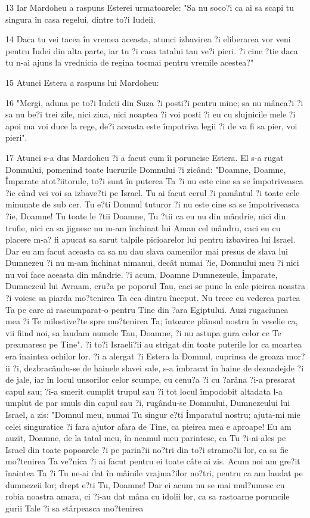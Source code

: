 \par 13 Iar Mardoheu a raspuns Esterei urmatoarele: "Sa nu soco?i ca ai sa scapi tu singura în casa regelui, dintre to?i Iudeii.
\par 14 Daca tu vei tacea în vremea aceasta, atunci izbavirea ?i eliberarea vor veni pentru Iudei din alta parte, iar tu ?i casa tatalui tau ve?i pieri. ?i cine ?tie daca tu n-ai ajuns la vrednicia de regina tocmai pentru vremile acestea?"
\par 15 Atunci Estera a raspuns lui Mardoheu:
\par 16 "Mergi, aduna pe to?i Iudeii din Suza ?i posti?i pentru mine; sa nu mânca?i ?i sa nu be?i trei zile, nici ziua, nici noaptea ?i voi posti ?i eu cu slujnicile mele ?i apoi ma voi duce la rege, de?i aceasta este împotriva legii ?i de va fi sa pier, voi pieri".
\par 17 Atunci s-a dus Mardoheu ?i a facut cum îi poruncise Estera. El s-a rugat Domnului, pomenind toate lucrurile Domnului ?i zicând: "Doamne, Doamne, Împarate atot?iitorule, to?i sunt în puterea Ta ?i nu este cine sa se împotriveasca ?ie când vei voi sa izbave?ti pe Israel. Tu ai facut cerul ?i pamântul ?i toate cele minunate de sub cer. Tu e?ti Domnul tuturor ?i nu este cine sa se împotriveasca ?ie, Doamne! Tu toate le ?tii Doamne, Tu ?tii ca eu nu din mândrie, nici din trufie, nici ca sa jignesc nu m-am închinat lui Aman cel mândru, caci eu cu placere m-a? fi apucat sa sarut talpile picioarelor lui pentru izbavirea lui Israel. Dar eu am facut aceasta ca sa nu dau slava oamenilor mai presus de slava lui Dumnezeu ?i nu m-am închinat nimanui, decât numai ?ie, Domnului meu ?i nici nu voi face aceasta din mândrie. ?i acum, Doamne Dumnezeule, Împarate, Dumnezeul lui Avraam, cru?a pe poporul Tau, caci se pune la cale pieirea noastra ?i voiesc sa piarda mo?tenirea Ta cea dintru început. Nu trece cu vederea partea Ta pe care ai rascumparat-o pentru Tine din ?ara Egiptului. Auzi rugaciunea mea ?i Te milostive?te spre mo?tenirea Ta; întoarce plânsul nostru în veselie ca, vii fiind noi, sa laudam numele Tau, Doamne, ?i nu astupa gura celor ce Te preamaresc pe Tine". ?i to?i Israeli?ii au strigat din toate puterile lor ca moartea era înaintea ochilor lor. ?i a alergat ?i Estera la Domnul, cuprinsa de groaza mor?ii ?i, dezbracându-se de hainele slavei sale, s-a îmbracat în haine de deznadejde ?i de jale, iar în locul unsorilor celor scumpe, cu cenu?a ?i cu ?arâna ?i-a presarat capul sau; ?i-a smerit cumplit trupul sau ?i tot locul împodobit altadata l-a umplut de par smuls din capul sau ?i, rugându-se Domnului, Dumnezeului lui Israel, a zis: "Domnul meu, numai Tu singur e?ti Împaratul nostru; ajuta-mi mie celei singuratice ?i fara ajutor afara de Tine, ca pieirea mea e aproape! Eu am auzit, Doamne, de la tatal meu, în neamul meu parintesc, ca Tu ?i-ai ales pe Israel din toate popoarele ?i pe parin?ii no?tri din to?i stramo?ii lor, ca sa fie mo?tenirea Ta ve?nica ?i ai facut pentru ei toate câte ai zis. Acum noi am gre?it înaintea Ta ?i Tu ne-ai dat în mâinile vrajma?ilor no?tri, pentru ca am laudat pe dumnezeii lor; drept e?ti Tu, Doamne! Dar ei acum nu se mai mul?umesc cu robia noastra amara, ci ?i-au dat mâna cu idolii lor, ca sa rastoarne poruncile gurii Tale ?i sa stârpeasca mo?tenirea 
